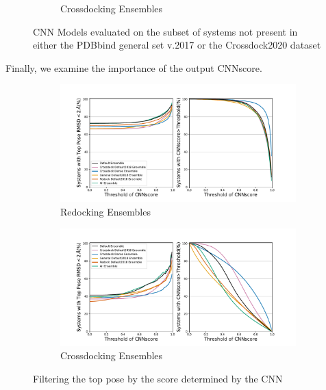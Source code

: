\documentclass[journal=jcisd8,manuscript=article]{achemso}
\begin{document}
\begin{figure}
\begin{subfigure}[b]{0.48\textwidth}
		\caption{Crossdocking Ensembles}
                \label{fig:No2017NoCD20EnsCD}
        \end{subfigure}
	\caption{CNN Models evaluated on the subset of systems not present in either the PDBbind general set v.2017 or the Crossdock2020 dataset}
	\label{fig:No2017NoCD20}
\end{figure}  

Finally, we examine the importance of the output CNNscore. 
\begin{figure}    
        \begin{subfigure}[b]{\textwidth}    
		\centering
		\includegraphics[width=\textwidth]{figures/redocking/thresh_cnnscore_ensembles.pdf}
		\caption{Redocking Ensembles}
		\label{fig:ThreshEnsRD}
        \end{subfigure}    
        \begin{subfigure}[b]{\textwidth}    
		\centering
		\includegraphics[width=\textwidth]{figures/crossdocking/thresh_cnnscore_ensembles.pdf}
		\caption{Crossdocking Ensembles}
                \label{fig:ThreshEnsCD}
        \end{subfigure}
	\caption{Filtering the top pose by the score determined by the CNN}
	\label{fig:ScoreThresh}
\end{figure} 
\end{document}
